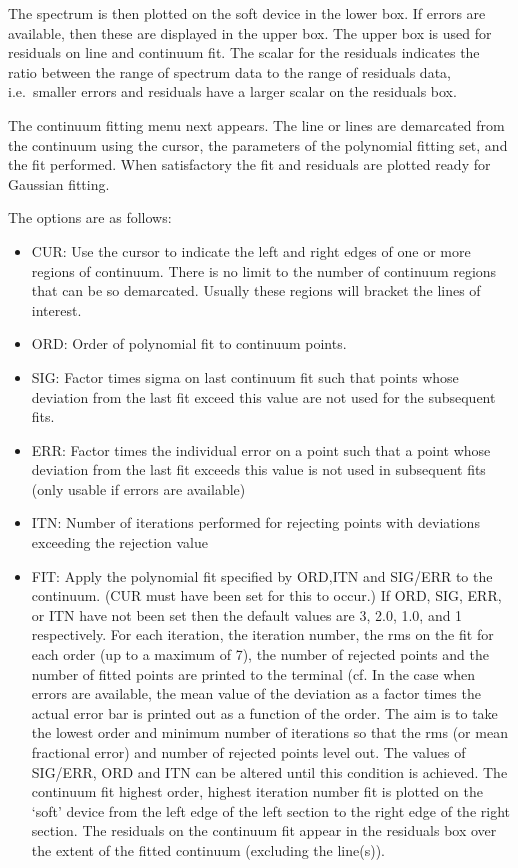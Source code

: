   The spectrum is then plotted on the soft device in the lower box. If
   errors are available, then these are displayed in the upper box. The
   upper box is used for residuals on line and continuum fit. The scalar
   for the residuals indicates the ratio between the range of spectrum
   data to the range of residuals data, i.e.\ smaller errors and
   residuals have a larger scalar on the residuals box.

   The continuum fitting menu next appears. The line or lines are
   demarcated from the continuum using the cursor, the parameters of the
   polynomial fitting set, and the fit performed. When satisfactory the
   fit and residuals are plotted ready for Gaussian fitting.

   The options are as follows:

\begin{itemize}
\item
   CUR: Use the cursor to indicate the left and right edges of one or
   more regions of continuum.  There is no limit to the number of
   continuum regions that can be so demarcated.  Usually these regions
   will bracket the lines of interest.

\item
   ORD: Order of polynomial fit to continuum points.

\item
   SIG: Factor times sigma on last continuum fit such that points
   whose deviation from the last fit exceed this value are not used for
   the subsequent fits.

\item
   ERR: Factor times the individual error on a point such that a
   point whose deviation from the last fit exceeds this value is not
   used in subsequent fits (only usable if errors are available)

\item
   ITN: Number of iterations performed for rejecting points with
   deviations exceeding the rejection value

\item
   FIT: Apply the polynomial fit specified by ORD,ITN and SIG/ERR to
   the continuum.  (CUR must have been set for this to occur.) If ORD,
   SIG, ERR, or ITN have not been set then the default values are 3,
   2.0, 1.0, and 1 respectively.  For each iteration, the iteration
   number, the rms on the fit for each order (up to a maximum of 7), the
   number of rejected points and the number of fitted points are printed
   to the terminal (cf.
   In the case when errors are available,
   the mean value of the deviation as a factor times the actual error
   bar is printed out as a function of the order. The aim is to take the
   lowest order and minimum number of iterations so that the rms (or
   mean fractional error) and number of rejected points level out. The
   values of SIG/ERR, ORD and ITN can be altered until this condition is
   achieved. The continuum fit highest order, highest iteration number
   fit is plotted on the `soft' device from the left edge of the left
   section to the right edge of the right section. The residuals on the
   continuum fit appear in the residuals box over the extent of the
   fitted continuum (excluding the line(s)).


\end{itemize}
